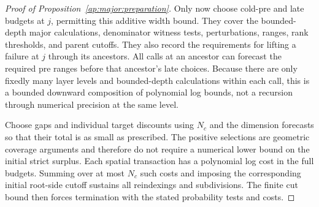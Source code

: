 \begin{proof}[Proof of Proposition~\ref{ap:major:preparation}]
Only now choose cold-pre and late budgets at $j$, permitting this
additive width bound.  They cover the bounded-depth major
calculations, denominator witness tests, perturbations, ranges,
rank thresholds, and parent cutoffs.  They also record the
requirements for lifting a failure at $j$ through its ancestors.
All calls at an ancestor can forecast the required pre ranges
before that ancestor's late choices.  Because there are only
fixedly many layer levels and bounded-depth calculations within
each call, this is a bounded downward composition of polynomial
log bounds, not a recursion through numerical precision at the
same level.

Choose gaps and individual target discounts using $N_c$ and the
dimension forecasts so that their total is as small as prescribed.
The positive selections are geometric coverage arguments and
therefore do not require a numerical lower bound on the initial
strict surplus.  Each spatial transaction has a polynomial log
cost in the full budgets.  Summing over at most $N_c$ such costs
and imposing the corresponding initial root-side cutoff sustains
all reindexings and subdivisions.  The finite cut bound then
forces termination with the stated probability tests and costs.
\end{proof}
